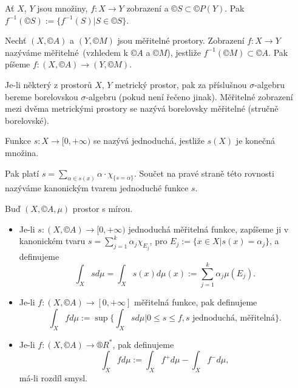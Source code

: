 \documentclass[12pt]{article}					%
\begin{document}
\begin{definice}
	Ať $X$, $Y$ jsou množiny, $f: X \rightarrow Y$ zobrazení a $©S \subset ©P(Y)$. Pak $f^{-1}(©S) := \{f^{-1}(S) | S \in ©S\}$.
\end{definice}

\begin{definice}
	Nechť $(X, ©A)$ a $(Y, ©M)$ jsou měřitelné prostory. Zobrazení $f: X \rightarrow Y$ nazýváme měřitelné (vzhledem k $©A$ a $©M$), jestliže $f^{-1}(©M) \subset ©A$. Pak píšeme $f: (X, ©A) \rightarrow (Y, ©M)$.

	Je-li některý z prostorů $X$, $Y$ metrický prostor, pak za příslušnou $\sigma$-algebru bereme borelovskou $\sigma$-algebru (pokud není řečeno jinak). Měřitelné zobrazení mezi dvěma metrickými prostory se nazývá borelovsky měřitelné (stručně borelovské).
\end{definice}

\begin{definice}
	Funkce $s: X \rightarrow [0, +∞)$ se nazývá jednoduchá, jestliže $s(X)$ je konečná množina.

	Pak platí $s = \sum_{\alpha \in s(x)} \alpha·\chi_{\{s=\alpha\}}$. Součet na pravé straně této rovnosti nazýváme kanonickým tvarem jednoduché funkce $s$.
\end{definice}

\begin{definice}
	Buď $(X, ©A, \mu)$ prostor s mírou.

	\begin{itemize}
		\item Je-li $s: (X, ©A) \rightarrow [0, +∞)$ jednoduchá měřitelná funkce, zapíšeme ji v kanonickém tvaru $s = \sum_{j=1}^k \alpha_j \chi_{E_j}$, pro $E_j := \{x \in X | s(x) = \alpha_j\}$, a definujeme
		$$ \int_X s d\mu = \int_X s(x) d\mu(x) := \sum_{j=1}^k \alpha_j \mu(E_j). $$
	\item Je-li $f: (X, ©A) \rightarrow [0, +∞]$ měřitelná funkce, pak definujeme
		$$ \int_X f d\mu := \sup\{\int_X s d\mu | 0 ≤ s ≤ f, s \text{ jednoduchá, měřitelná}\}. $$
	\item Je-li $f: (X, ©A) \rightarrow ®R^*$, pak definujeme
		$$ \int_X f d\mu := \int_X f^+ d\mu - \int_X f^- d\mu, $$
		má-li rozdíl smysl.
	\end{itemize}
\end{definice}

\end{document}
